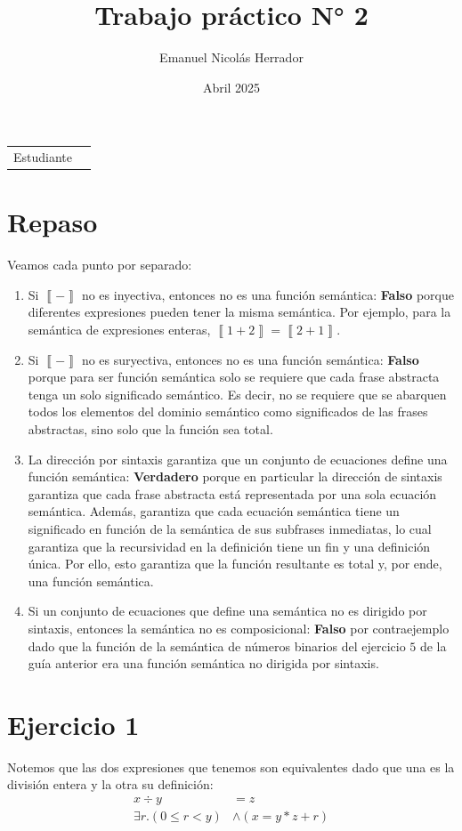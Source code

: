 \documentclass{article}
\title{Trabajo práctico N° 2}
\author{Emanuel Nicolás Herrador}
\date{Abril 2025}
\newcommand{\sem}[1]{\left\llbracket #1\right\rrbracket}
\begin{document}
\maketitle

\noindent\begin{tabular}{@{}ll}
	Estudiante & \theauthor \\
\end{tabular}

\section*{Repaso}
Veamos cada punto por separado:
\begin{enumerate}
	\item Si $\sem{-}$ no es inyectiva, entonces no es una función semántica: \textbf{Falso} porque diferentes expresiones pueden tener la misma semántica.
	      Por ejemplo, para la semántica de expresiones enteras, $\sem{1+2} = \sem{2+1}$.
	\item Si $\sem{-}$ no es suryectiva, entonces no es una función semántica: \textbf{Falso} porque para ser función semántica solo se requiere que cada frase abstracta tenga un solo significado semántico.
	      Es decir, no se requiere que se abarquen todos los elementos del dominio semántico como significados de las frases abstractas, sino solo que la función sea total.
	\item La dirección por sintaxis garantiza que un conjunto de ecuaciones define una función semántica: \textbf{Verdadero} porque en particular la dirección de sintaxis garantiza que cada frase abstracta está representada por una sola ecuación semántica.
	      Además, garantiza que cada ecuación semántica tiene un significado en función de la semántica de sus subfrases inmediatas, lo cual garantiza que la recursividad en la definición tiene un fin y una definición única.
	      Por ello, esto garantiza que la función resultante es total y, por ende, una función semántica.
	\item Si un conjunto de ecuaciones que define una semántica no es dirigido por sintaxis, entonces la semántica no es composicional: \textbf{Falso} por contraejemplo dado que la función de la semántica de números binarios del ejercicio $5$ de la guía anterior era una función semántica no dirigida por sintaxis.
\end{enumerate}

\section*{Ejercicio 1}
Notemos que las dos expresiones que tenemos son equivalentes dado que una es la división entera y la otra su definición:
\begin{equation*}
	\begin{aligned}
		x \div y                  & = z                   \\
		\exists r. (0 \leq r < y) & \land (x = y * z + r)
	\end{aligned}
\end{equation*}
\end{document}
